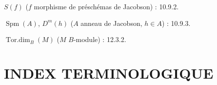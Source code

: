 $S(f)$ ($f$ morphisme de préschémas de Jacobson) : 10.9.2.

$\operatorname{Spm}(A)$, $D^m(h)$ ($A$ anneau de Jacobson, $h\in A$) : 10.9.3.

$\operatorname{Tor.dim}_B(M)$ ($M$ $B$-module) : 12.3.2.

\endgroup

\clearpage
{}
{}
\section*{INDEX TERMINOLOGIQUE}

\begingroup
\footnotesize
\setlength{\parindent}{0pt}
\setlength{\parskip}{1.1pt}
\newcommand{\EGAIVthreeTerm}[2]{#1 : #2.\par}

